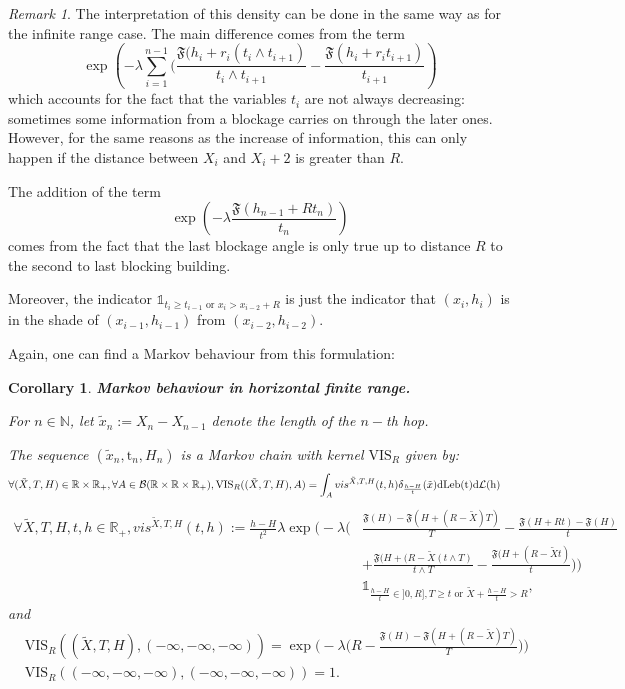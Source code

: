 \documentclass[10pt,english,a4paper]{smfart}
\newtheorem{corollary}{Corollary}[section]
\theoremstyle{definition}
\theoremstyle{remark}
\newtheorem{remark}{Remark}
\newcommand{\R}{\mathbb{R}}
\newcommand{\N}{\mathbb{N}}
\newcommand{\Leb}{\mathrm{Leb}}
\newcommand{\Half}{\R \times \R_+}
\newcommand{\primi}{\mathfrak{F}}
\begin{document}
\begin{remark}
The interpretation of this density can be done in the same way as for the infinite range case. The main difference comes from the term
\[\exp\left(-\lambda\sum_{i=1}^{n-1} (\frac{\primi(h_i + r_i (t_i \wedge t_{i+1})}{t_i\wedge t_{i+1}}-\frac{\primi(h_i +r_i t_{i+1})}{t_{i+1}}\right)\]
which accounts for the fact that the variables $t_i$ are not always decreasing: sometimes some information from a blockage carries on through the later ones. However, for the same reasons as the increase of information, this can only happen if the distance between $X_i$ and $X_i+2$ is greater than $R$.

The addition of the term
\[\exp\left(-\lambda\frac{\primi(h_{n-1}+Rt_n)}{t_n}\right)\]
comes from the fact that the last blockage angle is only true up to distance $R$ to the second to last blocking building.

Moreover, the indicator $\mathds{1}_{t_i\geq t_{i-1} \text{ or } x_i > x_{i-2}+R }$ is just the indicator that $(x_i, h_i)$ is in the shade of $(x_{i-1}, h_{i-1})$ from $(x_{i-2}, h_{i-2})$.

\end{remark}

Again, one can find a Markov behaviour from this formulation:
\begin{corollary}\label{Markov_f}\textbf{Markov behaviour in horizontal finite range.}

For $n\in\N$, let $\tilde{x}_n:= X_n-X_{n-1}$ denote the length of the $n-$th hop.

The sequence $(\tilde{x}_n, \mathrm{t}_n, H_n)$ is a Markov chain with kernel $\mathrm{VIS}_R$ given by:
    \begin{align*}
        &\forall (\tilde{X}, T, H)\in \Half, \forall A \in \mathcal{B}(\R\times\Half), \mathrm{VIS}_R((\tilde{X}, T, H), A) = \int_A vis^{\tilde{X}, T, H}(t, h) \delta_{\frac{h-H}{t} }(\tilde{x})\rm{d}\Leb(t) \rm{d}\mathcal{L}(h)
        \end{align*}
    \begin{align*}
        \forall \tilde{X}, T, H, t, h \in \R_+, vis^{\tilde{X}, T, H} (t, h) :=\frac{h-H}{t^2}\lambda \exp\Biggl(-\lambda \Biggl(&\frac{\primi(H)-\primi(H+(R-\tilde{X})T)}{T}-\frac{\primi(H+Rt)-\primi(H)}{t}\\
        &+\frac{\primi(H + (R-\tilde{X} (t \wedge T)}{t\wedge T}-\frac{\primi(H +(R-\tilde{X} t)}{t}\Biggl)\Biggl)\\
        &\mathds{1}_{\frac{h-H}{t}\in ]0, R], T\geq t \text{ or } \tilde{X}+ \frac{h-H}{t}> R } ,
    \end{align*}
    and 
    \begin{align*}
        &\mathrm{VIS}_R((\tilde{X}, T, H), (-\infty, -\infty, -\infty)) = \exp\Biggl(-\lambda \Biggl(R - \frac{\primi(H)-\primi(H+(R-\tilde{X})T)}{T}\Biggl)\Biggl)\\
        &\mathrm{VIS}_R((-\infty, -\infty, -\infty), (-\infty, -\infty, -\infty)) = 1.
    \end{align*}
\end{corollary}
\end{document}
